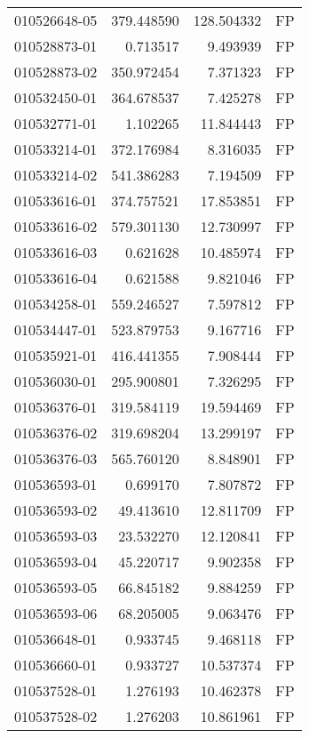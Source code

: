 \begin{tabular}{lrrl}
010526648-05 &  379.448590 &     128.504332 &   FP \\
010528873-01 &    0.713517 &       9.493939 &   FP \\
010528873-02 &  350.972454 &       7.371323 &   FP \\
010532450-01 &  364.678537 &       7.425278 &   FP \\
010532771-01 &    1.102265 &      11.844443 &   FP \\
010533214-01 &  372.176984 &       8.316035 &   FP \\
010533214-02 &  541.386283 &       7.194509 &   FP \\
010533616-01 &  374.757521 &      17.853851 &   FP \\
010533616-02 &  579.301130 &      12.730997 &   FP \\
010533616-03 &    0.621628 &      10.485974 &   FP \\
010533616-04 &    0.621588 &       9.821046 &   FP \\
010534258-01 &  559.246527 &       7.597812 &   FP \\
010534447-01 &  523.879753 &       9.167716 &   FP \\
010535921-01 &  416.441355 &       7.908444 &   FP \\
010536030-01 &  295.900801 &       7.326295 &   FP \\
010536376-01 &  319.584119 &      19.594469 &   FP \\
010536376-02 &  319.698204 &      13.299197 &   FP \\
010536376-03 &  565.760120 &       8.848901 &   FP \\
010536593-01 &    0.699170 &       7.807872 &   FP \\
010536593-02 &   49.413610 &      12.811709 &   FP \\
010536593-03 &   23.532270 &      12.120841 &   FP \\
010536593-04 &   45.220717 &       9.902358 &   FP \\
010536593-05 &   66.845182 &       9.884259 &   FP \\
010536593-06 &   68.205005 &       9.063476 &   FP \\
010536648-01 &    0.933745 &       9.468118 &   FP \\
010536660-01 &    0.933727 &      10.537374 &   FP \\
010537528-01 &    1.276193 &      10.462378 &   FP \\
010537528-02 &    1.276203 &      10.861961 &   FP \\

\end{tabular}
